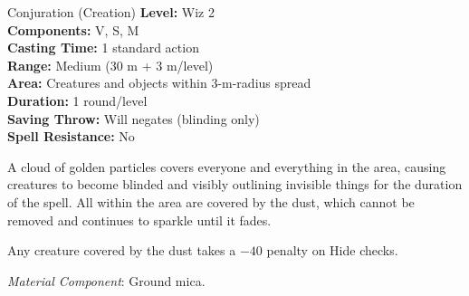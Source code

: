 {Conjuration (Creation)}
{
	\textbf{Level:}
	Wiz 2\\
	\textbf{Components:}
	V, S, M\\
	\textbf{Casting Time:}
	1 standard action\\
	\textbf{Range:}
	Medium (30 m + 3 m/level)\\
	\textbf{Area:}
	Creatures and objects within 3-m-radius spread\\
	\textbf{Duration:}
	1 round/level\\
	\textbf{Saving Throw:}
	Will negates (blinding only)\\
	\textbf{Spell Resistance:}
	No\\
}
{
	A cloud of golden particles covers everyone and everything in the area, causing creatures to become blinded and visibly outlining invisible things for the duration of the spell. All within the area are covered by the dust, which cannot be removed and continues to sparkle until it fades.

	Any creature covered by the dust takes a $-40$ penalty on Hide checks.

	\textit{Material Component}:
	Ground mica.

}
